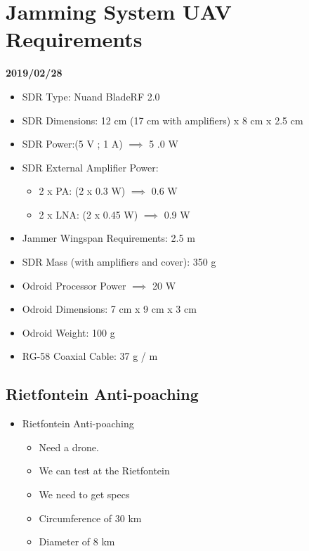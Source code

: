 \documentclass[11pt]{article}
\providecommand{\tightlist}{%
      \setlength{\itemsep}{0pt}\setlength{\parskip}{0pt}}
\begin{document}
    \hypertarget{jamming-system-uav-requirements}{%
\section{Jamming System UAV
Requirements}\label{jamming-system-uav-requirements}}

\textbf{2019/02/28}

\begin{itemize}
\tightlist
\item
  SDR Type: Nuand BladeRF 2.0
\item
  SDR Dimensions: 12 cm (17 cm with amplifiers) x 8 cm x 2.5 cm
\item
  SDR Power:(5 V ; 1 A) \(\implies\) 5 .0 W
\item
  SDR External Amplifier Power:

  \begin{itemize}
  \tightlist
  \item
    2 x PA: (2 x 0.3 W) \(\implies\) 0.6 W
  \item
    2 x LNA: (2 x 0.45 W) \(\implies\) 0.9 W
  \end{itemize}
\item
  Jammer Wingspan Requirements: 2.5 m
\item
  SDR Mass (with amplifiers and cover): 350 g
\item
  Odroid Processor Power \(\implies\) 20 W
\item
  Odroid Dimensions: 7 cm x 9 cm x 3 cm
\item
  Odroid Weight: 100 g
\item
  RG-58 Coaxial Cable: 37 g / m
\end{itemize}

    \hypertarget{rietfontein-anti-poaching}{%
\subsection{Rietfontein Anti-poaching}\label{rietfontein-anti-poaching}}

    \begin{itemize}
\tightlist
\item
  Rietfontein Anti-poaching

  \begin{itemize}
  \tightlist
  \item
    Need a drone.
  \item
    We can test at the Rietfontein
  \item
    We need to get specs
  \item
    Circumference of 30 km
  \item
    Diameter of 8 km
  \end{itemize}
\end{itemize}
\end{document}
